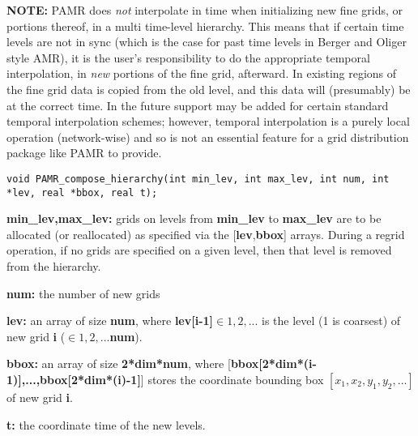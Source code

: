 \documentclass[aps,amssymb,unsortedaddress,nofootinbib]{revtex4}
\def\lsep{\itemsep 0.05in}
\begin{document}
\par

{\bf NOTE:} PAMR does {\em not} interpolate in time when initializing new fine grids,
            or portions thereof, in a multi time-level hierarchy. This means that
            if certain time levels are not in sync (which is the case for past time
            levels in Berger and Oliger style AMR), it is the user's responsibility
            to do the appropriate temporal interpolation, in {\em new} portions of
            the fine grid, afterward. In existing regions of the
            fine grid data is copied from the old level, and this data will (presumably)
            be at the correct time. In the future support may be added for certain
            standard temporal interpolation schemes; however, temporal interpolation
            is a purely local operation (network-wise) and so is not an essential feature for a
            grid distribution package like PAMR to provide. 


\begin{verbatim}
void PAMR_compose_hierarchy(int min_lev, int max_lev, int num, int *lev, real *bbox, real t);
\end{verbatim}
\begin{list}{}{\lsep}
\item {\bf min\_lev,max\_lev:} grids on levels from {\bf min\_lev} to {\bf max\_lev} are to be allocated 
                               (or reallocated) as specified via the [{\bf lev},{\bf bbox}] 
                               arrays. During a regrid operation, if no grids are specified on a given
                               level, then that level is removed from the hierarchy.
                             
\item {\bf num:} the number of new grids
\item {\bf *lev:} an array of size {\bf num}, where {\bf lev[i-1]}$\in 1,2,...$ is the level (1 is 
                  coarsest) of new grid {\bf i} ($\in 1,2,...${\bf num}).
\item {\bf *bbox:} an array of size {\bf 2*dim*num}, where
                  [{\bf bbox[2*dim*(i-1)],...,bbox[2*dim*(i)-1]}] stores
                  the coordinate bounding box $[x_1,x_2,y_1,y_2,...]$ of new grid {\bf i}.
\item {\bf t:} the coordinate time of the new levels.
\end{list}
\end{document}
